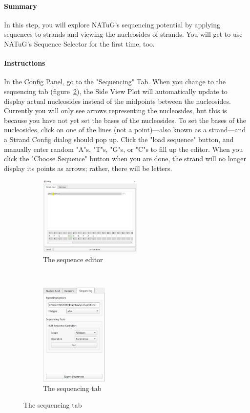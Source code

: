 \documentclass[
titlepage,
fontsize=12pt
]{article}
\begin{document}
	\paragraph{Summary}
	In this step, you will explore NATuG's sequencing potential by applying sequences to strands and viewing the nucleosides of strands. You will get to use NATuG's Sequence Selector for the first time, too.
	
	\paragraph{Instructions}
	In the Config Panel, go to the "Sequencing" Tab. When you change to the sequencing tab (figure~\ref{fig:sequencing-tab-instructions}), the Side View Plot will automatically update to display actual nucleosides instead of the midpoints between the nucleosides. Currently you will only see arrows representing the nucleosides, but this is because you have not yet set the bases of the nucleosides. To set the bases of the nucleosides, click on one of the lines (not a point)---also known as a strand---and a Strand Config dialog should pop up. Click the "load sequence" button, and manually enter random "A"s, "T"s, "G"s, or "C"s to fill up the editor. When you click the "Choose Sequence" button when you are done, the strand will no longer display its points as arrows; rather, there will be letters. 
	
	\begin{figure}
		\caption{Sequencing capabilities}
		\centering
		\begin{subfigure}{.4\linewidth}
			\centering
			\includegraphics[width=2in]{sequence-editor-manual-input.png}
			\caption{The sequence editor}
		\end{subfigure}%
		~
		\begin{subfigure}{.4\linewidth}
			\centering
			\includegraphics[height=2in]{sequencing-tab.png}
			\caption{The sequencing tab}
			\label{fig:sequencing-tab-instructions}
		\end{subfigure}
	\end{figure}
	
\end{document}
